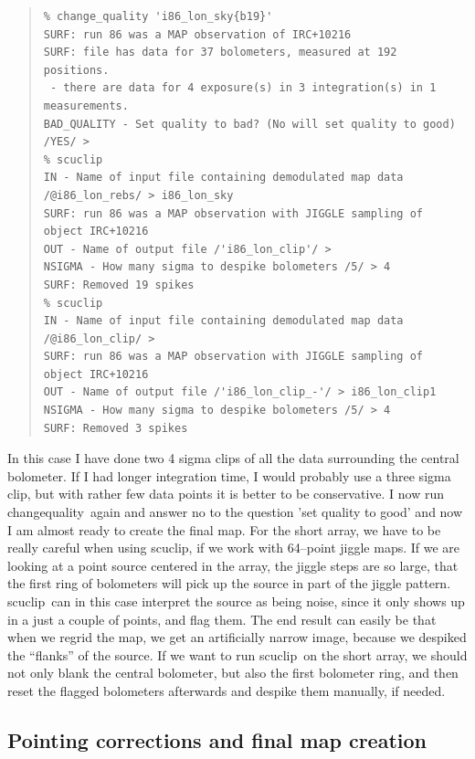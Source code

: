 \documentclass[twoside,11pt]{article}
\newenvironment{myquote}{\begin{quote}\begin{small}}{\end{small}\end{quote}}
\newcommand{\task}[1]{\textsf{#1}}
\newcommand{\chgqual}{\xref{\task{change\_\-qua\-lity}}{sun216}{CHANGE_QUALITY}}
\newcommand{\scuclip}{\xref{\task{scuclip}}{sun216}{SCUCLIP}}
\newcommand{\xref}[3]{#1}
\newcommand{\xlabel}[1]{}
\renewcommand{\_}{\texttt{\symbol{95}}}
\begin{document}
\begin{myquote}
\begin{verbatim}
% change_quality 'i86_lon_sky{b19}'
SURF: run 86 was a MAP observation of IRC+10216
SURF: file has data for 37 bolometers, measured at 192 positions.
 - there are data for 4 exposure(s) in 3 integration(s) in 1 measurements.
BAD_QUALITY - Set quality to bad? (No will set quality to good) /YES/ > 
% scuclip
IN - Name of input file containing demodulated map data 
/@i86_lon_rebs/ > i86_lon_sky
SURF: run 86 was a MAP observation with JIGGLE sampling of object IRC+10216
OUT - Name of output file /'i86_lon_clip'/ > 
NSIGMA - How many sigma to despike bolometers /5/ > 4
SURF: Removed 19 spikes
% scuclip
IN - Name of input file containing demodulated map data /@i86_lon_clip/ > 
SURF: run 86 was a MAP observation with JIGGLE sampling of object IRC+10216
OUT - Name of output file /'i86_lon_clip_-'/ > i86_lon_clip1
NSIGMA - How many sigma to despike bolometers /5/ > 4
SURF: Removed 3 spikes
\end{verbatim}
\end{myquote}

In this case I have done two 4 sigma clips of all the data surrounding
the central bolometer. If I had longer integration time, I would
probably use a three sigma clip, but with rather few data points it is
better to be conservative. I now run \chgqual\ again and answer no to
the question 'set quality to good' and now I am almost ready to create
the final map. For the short array, we have to be really careful when
using \scuclip, if we work with 64--point jiggle maps. If we are
looking at a point source centered in the array, the jiggle steps are
so large, that the first ring of bolometers will pick up the source in
part of the jiggle pattern. \scuclip\ can in this case interpret the
source as being noise, since it only shows up in a just a couple of
points, and flag them. The end result can easily be that when
we regrid the map, we get an artificially narrow image, because we
despiked the ``flanks'' of the source. If we want to run \scuclip\ on
the short array, we should not only blank the central bolometer, but
also the first bolometer ring, and then reset the flagged bolometers
afterwards and despike them manually, if needed.


\subsection{\xlabel{Pointing}Pointing corrections and final map creation}
\end{document}
